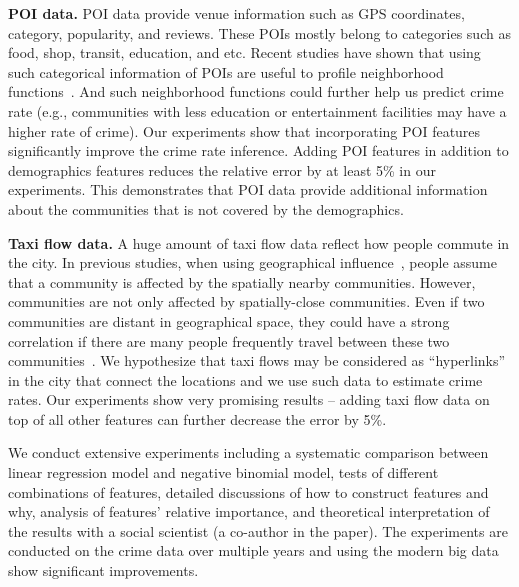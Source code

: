 \textbf{POI data.} POI data provide venue information such as GPS coordinates, category, popularity, and reviews. These POIs mostly belong to categories such as food, shop, transit, education, and etc. Recent studies have shown that using such categorical information of POIs are useful to profile neighborhood functions~\cite{YZX12}. And such neighborhood functions could further help us predict crime rate (e.g., communities with less education or entertainment facilities may have a higher rate of crime). Our experiments show that incorporating POI features   significantly improve the crime rate inference. Adding POI features in addition to demographics features reduces the relative error by at least 5\% in our experiments. This demonstrates that POI data provide additional information about the communities that is not covered by the demographics.

\textbf{Taxi flow data.} A huge amount of taxi flow data reflect how people commute in the city. In previous studies, when using geographical influence~\cite{Ans02}, people assume that a community is affected by the spatially nearby communities. However, communities are not only affected by spatially-close communities. Even if two communities are distant in geographical space, they could have a strong correlation if there are many people frequently travel between these two communities~\cite{GGM14}. We hypothesize that taxi flows may be considered as ``hyperlinks'' in the city that connect the locations and we use such data to estimate crime rates. Our experiments show very promising results --  adding taxi flow data on top of all other features can further decrease the error by 5\%.

We conduct extensive experiments including a systematic comparison between linear regression model and negative binomial model, tests of different combinations of  features, detailed discussions of how to construct features and why, analysis of features' relative importance, and theoretical interpretation of the results with a social scientist (a co-author in the paper). The experiments are conducted on the crime data over multiple years and using the modern big data show significant improvements.
